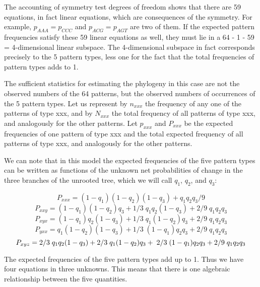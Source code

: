 The accounting
of symmetry test degrees of freedom shows that there are 59 equations,
in fact linear equations, which are consequences of the symmetry. For
example,  $p_{AAA} = p_{CCC}$ and $p_{ACG} = p_{AGT}$ are two of them.  If the
expected pattern frequencies satisfy these 59 linear equations as
well, they must lie in a 64 - 1 - 59 = 4-dimensional linear subspace.
The 4-dimensional subspace in fact corresponds precisely to the 5
pattern types, less one for the fact that the total frequencies of pattern
types adds to 1.

The sufficient statistics for estimating the phylogeny in this case are not the
observed numbers of the 64 patterns, but the observed numbers of
occurrences of the 5 pattern types.  Let us represent by $n_{xxx}$ the
frequency of any one of the patterns of type xxx, and by $N_{xxx}$ the
total frequency of all patterns of type xxx, and analogously for the
other patterns.  Let $p_{xxx}$ and $P_{xxx}$ be the expected frequencies of
one pattern of type xxx and the total expected frequency of all patterns
of type xxx, and analogously for the other patterns.

We can note that in this model the expected frequencies of the five
pattern types can be written as functions of the unknown net probabilities of
change in the three branches of the unrooted tree, which we will call $q_1$,
$q_2$, and $q_3$:

\medskip
\begin{equation} %
P_{xxx}   =   (1-q_1)(1-q_2)(1-q_3) + q_1q_2q_3/9
\end{equation}
\medskip
\begin{equation} %
P_{xxy}   =   (1-q_1)(1-q_2)q_3  +  1/3\; q_1q_2(1-q_3)  +  2/9\; q_1q_2q_3
\end{equation}
\medskip
\begin{equation} %
P_{xyx}   =   (1-q_1)q_2(1-q_3)  +  1/3\; q_1(1-q_2)q_3  +  2/9\; q_1q_2q_3
\end{equation}
\medskip
\begin{equation} %
P_{yxx}   =   q_1(1-q_2)(1-q_3)  +  1/3\; (1-q_1)q_2q_3  +  2/9\; q_1q_2q_3
\end{equation}
\medskip
\begin{equation} %
P_{xyz}   =   2/3\; q_1q_2(1-q_3)  +  2/3\; q_1(1-q_2)q_3\\
              + \; 2/3\; (1-q_1)q_2q_3  + 2/9\; q_1q_2q_3
\end{equation}
\medskip

The expected frequencies of the five pattern types add up to 1.  Thus we
have four equations in three unknowns.  This means that there is one
algebraic relationship between the five quantities.  

